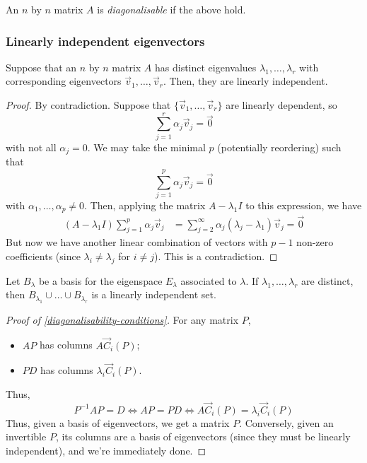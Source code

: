 \documentclass{../../template/note}
\begin{document}
    \begin{definition}
        An \(n\) by \(n\) matrix \(A\) is \emph{diagonalisable} if the above hold.
    \end{definition}
    

    \subsubsection{Linearly independent eigenvectors}

    \begin{theorem}
        Suppose that an \(n\) by \(n\) matrix \(A\) has distinct eigenvalues \(\lambda_1, \dots, \lambda_r\) with corresponding eigenvectors \(\vec v_1, \dots, \vec v_r\). Then, they are linearly independent.
    \end{theorem}
    
    \begin{proof}
        By contradiction. Suppose that \(\{\vec v_1, \dots, \vec v_r\}\) are linearly dependent, so
        \[
            \sum_{j=1}^r \alpha_j \vec v_j = \vec 0
        \]
        with not all \(\alpha_j = 0\). We may take the minimal \(p\) (potentially reordering) such that
        \[
            \sum_{j=1}^p \alpha_j \vec v_j = \vec 0
        \]
        with \(\alpha_1, \dots, \alpha_p \neq 0\). Then, applying the matrix \(A - \lambda_1I\) to this expression, we have
        \begin{align*}
            (A - \lambda_1I)\sum_{j=1}^p \alpha_j \vec v_j &= \sum_{j=2}^\infty \alpha_j (\lambda_j - \lambda_1)\vec v_j = \vec 0
        \end{align*}
        But now we have another linear combination of vectors with \(p-1\) non-zero coefficients (since \(\lambda_i \neq \lambda_j\) for \(i \neq j\)). This is a contradiction.
    \end{proof}
    
    \begin{remark}
        Let \(B_\lambda\) be a basis for the eigenspace \(E_\lambda\) associated to \(\lambda\). If \(\lambda_1, \dots, \lambda_r\) are distinct, then \(B_{\lambda_1} \cup \dots \cup B_{\lambda_r}\) is a linearly independent set.
    \end{remark}

    \begin{proof}[Proof of \cref{diagonalisability-conditions}]
        For any matrix \(P\),
        \begin{itemize}
            \item \(AP\) has columns \(A\vec C_i(P)\);
            \item \(PD\) has columns \(\lambda_i \vec C_i(P)\).
        \end{itemize}
        Thus,
        \[
            P^{-1}AP = D \iff AP = PD \iff A \vec C_i(P) = \lambda_i \vec C_i(P)
        \]
        Thus, given a basis of eigenvectors, we get a matrix \(P\). Conversely, given an invertible \(P\), its columns are a basis of eigenvectors (since they must be linearly independent), and we're immediately done.
    \end{proof}
    
\end{document}
